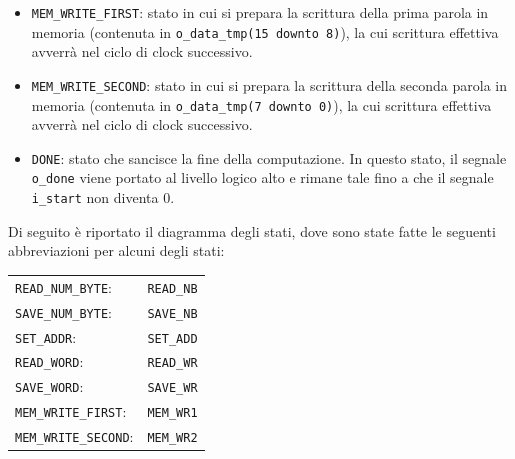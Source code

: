 \documentclass{article}
\begin{document}
\begin{itemize}
    \item \texttt{MEM\_WRITE\_FIRST}: stato in cui si prepara la scrittura della prima parola in memoria (contenuta in \texttt{o\_data\_tmp(15 downto 8)}), la cui scrittura effettiva avverrà nel ciclo di clock successivo.
    \item \texttt{MEM\_WRITE\_SECOND}: stato in cui si prepara la scrittura della seconda parola in memoria (contenuta in \texttt{o\_data\_tmp(7 downto 0)}), la cui scrittura effettiva avverrà nel ciclo di clock successivo.
    \item \texttt{DONE}: stato che sancisce la fine della computazione. In questo stato, il segnale \texttt{o\_done} viene portato al livello logico alto e rimane tale fino a che il segnale \texttt{i\_start} non diventa 0.
\end{itemize}
Di seguito è riportato il diagramma degli stati, dove sono state fatte le seguenti abbreviazioni per alcuni degli stati:
\begin{center}
\begin{tabular}{ll}
\texttt{READ\_NUM\_BYTE}: & \texttt{READ\_NB} \\
\texttt{SAVE\_NUM\_BYTE}: & \texttt{SAVE\_NB} \\
\texttt{SET\_ADDR}: & \texttt{SET\_ADD} \\
\texttt{READ\_WORD}: & \texttt{READ\_WR} \\
\texttt{SAVE\_WORD}: & \texttt{SAVE\_WR} \\
\texttt{MEM\_WRITE\_FIRST}: & \texttt{MEM\_WR1} \\
\texttt{MEM\_WRITE\_SECOND}: & \texttt{MEM\_WR2} \\
\end{tabular}
\end{center}
\end{document}
